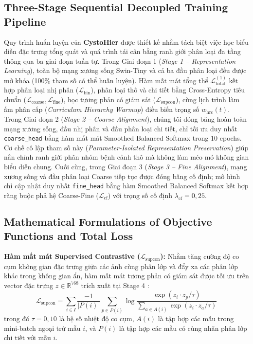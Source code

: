 \documentclass[runningheads]{llncs}
\begin{document}
\subsection{Three-Stage Sequential Decoupled Training Pipeline}
Quy trình huấn luyện của \textbf{CystoHier} được thiết kế nhằm tách biệt việc học biểu diễn đặc trưng tổng quát và quá trình tái cân bằng ranh giới phân loại đa tầng thông qua ba giai đoạn tuần tự. Trong Giai đoạn 1 (\textit{Stage 1 -- Representation Learning}), toàn bộ mạng xương sống Swin-Tiny và cả ba đầu phân loại đều được mở khóa (100\% tham số có thể huấn luyện). Hàm mất mát tổng thể $\mathcal{L}_{\text{total}}^{(1)}$ kết hợp phân loại nhị phân ($\mathcal{L}_{\text{bin}}$), phân loại thô và chi tiết bằng Cross-Entropy tiêu chuẩn ($\mathcal{L}_{\text{coarse}}, \mathcal{L}_{\text{fine}}$), học tương phản có giám sát ($\mathcal{L}_{\text{supcon}}$), cùng lịch trình làm ấm phân cấp (\textit{Curriculum Hierarchy Warmup}) điều biến trọng số $w_{\text{hrc}}(t)$. Trong Giai đoạn 2 (\textit{Stage 2 -- Coarse Alignment}), chúng tôi đóng băng hoàn toàn mạng xương sống, đầu nhị phân và đầu phân loại chi tiết, chỉ tối ưu duy nhất \texttt{coarse\_head} bằng hàm mất mát Smoothed Balanced Softmax trong 10 epochs. Cơ chế cô lập tham số này (\textit{Parameter-Isolated Representation Preservation}) giúp nắn chỉnh ranh giới phân nhóm bệnh cảnh thô mà không làm méo mó không gian biểu diễn chung. Cuối cùng, trong Giai đoạn 3 (\textit{Stage 3 -- Fine Alignment}), mạng xương sống và đầu phân loại Coarse tiếp tục được đóng băng cố định; mô hình chỉ cập nhật duy nhất \texttt{fine\_head} bằng hàm Smoothed Balanced Softmax kết hợp ràng buộc phả hệ Coarse-Fine ($\mathcal{L}_{\text{cf}}$) với trọng số cố định $\lambda_{\text{cf}} = 0{,}25$.

\subsection{Mathematical Formulations of Objective Functions and Total Loss}
\noindent \textbf{Hàm mất mát Supervised Contrastive ($\mathcal{L}_{\text{supcon}}$):} Nhằm tăng cường độ co cụm không gian đặc trưng giữa các ảnh cùng phân lớp và đẩy xa các phân lớp khác trong không gian ẩn, hàm mất mát tương phản có giám sát được tối ưu trên vector đặc trưng $z \in \mathbb{R}^{768}$ trích xuất tại Stage 4 \cite{ref_khosla2020supervised}:
\begin{equation}
\mathcal{L}_{\text{supcon}} = \sum_{i \in I} \frac{-1}{|P(i)|} \sum_{p \in P(i)} \log \frac{\exp(z_i \cdot z_p / \tau)}{\sum_{a \in A(i)} \exp(z_i \cdot z_a / \tau)}
\end{equation}
trong đó $\tau = 0{,}10$ là hệ số nhiệt độ co cụm, $A(i)$ là tập hợp các mẫu trong mini-batch ngoại trừ mẫu $i$, và $P(i)$ là tập hợp các mẫu có cùng nhãn phân lớp chi tiết với mẫu $i$.
\end{document}
